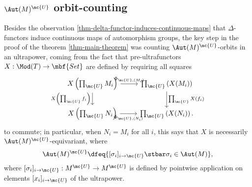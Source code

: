 %
%
%
%
%
%
%

\subsection{$\Aut(M)^{\mc{U}}$ orbit-counting}
Besides the observation \ref{thm-delta-functor-induces-continuous-maps} that $\Delta$-functors induce continuous maps of automorphism groups, the key step in the proof of the theorem \ref{thm-main-theorem} was counting $\Aut(M)^{\mc{U}}$-orbits in an ultrapower, coming from the fact that pre-ultrafunctors $X : \Mod(T) \to \mbf{Set}$ are defined by requiring all squares
$$
\begin{tikzcd}[ampersand replacement = \&]
X\left(\prod_{\mc{U}} M_i\right) \arrow[swap]{d}{X\left(\prod_{\mc{U}} f_i \right)} \arrow{r}{\Phi_{\mc{U}, (M_i)}}  \& \prod_{\mc{U}} \left( X(M_i) \right) \arrow{d}{\prod_{\mc{U}} X(f_i)}\\
X\left(\prod_{\mc{U}} N_i\right) \arrow[swap]{r}{\Phi_{\mc{U}, (N_i)}} \& \prod_{\mc{U}} \left( X(N_i)\right).
\end{tikzcd}
$$
to commute; in particular, when $N_i = M_i$ for all $i$, this says that $X$ is necessarily $\Aut(M)^{\mc{U}}$-equivariant, where
$$
\Aut(M)^{\mc{U}} \dfeq \{[\sigma_i]_{i \to \mc{U}} \stbar \sigma_i \in \Aut(M)\},
$$
where $[\sigma_i]_{i \to \mc{U}} : M^{\mc{U}} \to M^{\mc{U}}$ is defined by pointwise application on elements $[x_i]_{i \to \mc{U}}$ of the ultrapower.

